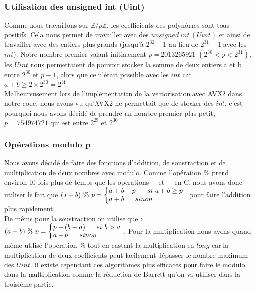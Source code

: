 \documentclass[12pt, a4paper]{article}
\begin{document}
\subsubsection{Utilisation des unsigned int (Uint)}

Comme nous travaillons sur $\mathbb{Z}/p\mathbb{Z}$, les coefficients des polynômes sont tous positifs. Cela nous permet de travailler avec des $unsigned\ int\ (Uint)$ et ainsi de travailler avec des entiers plus grands (jusqu’à $2^{32}-1$ au lieu de $2^{31}-1$ avec les $int$). Notre nombre premier valant initialement $p=2013265921$ $(2^{30} < p < 2^{31})$, les $Uint$ nous permettaient de pouvoir stocker la somme de deux entiers a et b entre $2^{30}$ et $p-1$, alors que ce n'était possible avec les $int$ car $a+b\geq2\times2^{30}=2^{31}$. \\
Malheureusement lors de l'implémentation de la vectorisation avec AVX2 dans notre code, nous avons vu qu'AVX2 ne permettait que de stocker des $int$, c'est pourquoi nous avons décidé de prendre un nombre premier plus petit, $p=754974721$ qui est entre $2^{29}$ et  $2^{30}$.

\subsubsection{Opérations modulo p}

Nous avons décidé de faire des fonctions d'addition, de soustraction et de multiplication de deux nombres avec modulo. Comme l'opération $\%$ prend environ 10 fois plus de temps que les opérations $+$ et $-$ en C, nous avons donc utiliser le fait que 
$ (a+b)\ \%\ p = 
\left\{\begin{array}{@{}l@{}}
a + b - p\ \ \ \ \ si\ a+b \geq p\\
a + b\ \ \ \ \ sinon
\end{array}\right.\,\ $ pour faire l'addition plus rapidement. \\
De même pour la soustraction on utilise que :
$ (a-b)\ \%\ p = 
\left\{\begin{array}{@{}l@{}}
p - (b - a)\ \ \ \ \ si\ b > a\\
a - b\ \ \ \ \ sinon
\end{array}\right.\,.$
Pour la multiplication nous avons quand même utilisé l'opération $\%$ tout en castant la multiplication en $long$ car la multiplication de deux coefficients peut facilement dépasser le nombre maximum des $Uint$. Il existe cependant des algorithmes plus efficaces pour faire le modulo dans la multiplication comme la réduction de Barrett qu'on va utiliser dans la troisième partie.
\end{document}
